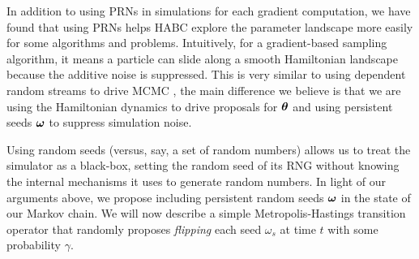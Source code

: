 \documentclass[]{article}
\begin{document}
In addition to using PRNs in simulations for each gradient computation,  we have found that using PRNs helps  HABC explore the parameter landscape more easily for some algorithms and problems.  Intuitively, for a gradient-based sampling algorithm, it means a particle can slide along a smooth Hamiltonian landscape because    the additive noise is suppressed.  This is very similar to using dependent random streams to drive MCMC \cite{Murray2012,Neal2012}, the main difference we believe is that we are using the Hamiltonian dynamics to drive proposals for ${\bm \theta}$ and using persistent seeds ${\bm \omega}$ to suppress simulation noise.

  
Using random seeds (versus, say, a set of random numbers) allows us to treat the simulator as a black-box, setting the random seed of its RNG without knowing the internal mechanisms it uses to generate random numbers.  In light of our arguments above, we propose including persistent random seeds ${\bm \omega}$ in the state of our Markov chain.    We will now describe a simple  Metropolis-Hastings transition operator that randomly proposes {\em flipping} each seed $\omega_s$ at time $t$ with some probability $\gamma$.  
\end{document}
